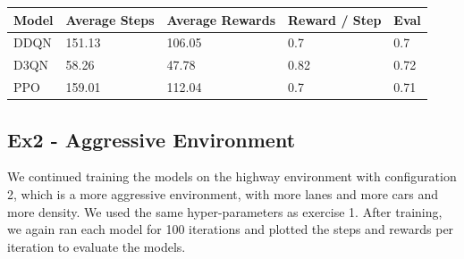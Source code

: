 \documentclass[leqno]{article}
\begin{document}
\begin{multicols}{2}
\begin{tabular}{ |p{1cm}||p{1.5cm}|p{1.5cm}|p{1.2cm}|p{1cm}|  }
 \hline
 Model&Average Steps& Average Rewards& Reward / Step&Eval\\
 \hline
 DDQN & 151.13 & 106.05 & 0.7 & 0.7\\
 D3QN & 58.26 & 47.78 & 0.82 & 0.72\\
 PPO & 159.01 &112.04 &  0.7 & 0.71\\
 \hline
\end{tabular}

\subsection{Ex2 - Aggressive Environment}

We continued training the models on the highway environment with configuration 2, which is a more aggressive environment, with more lanes and more cars and more density. We used the same hyper-parameters as exercise 1. After training, we again ran each model for 100 iterations and plotted the steps and rewards per iteration to evaluate the models.


\end{multicols}
\end{document}
